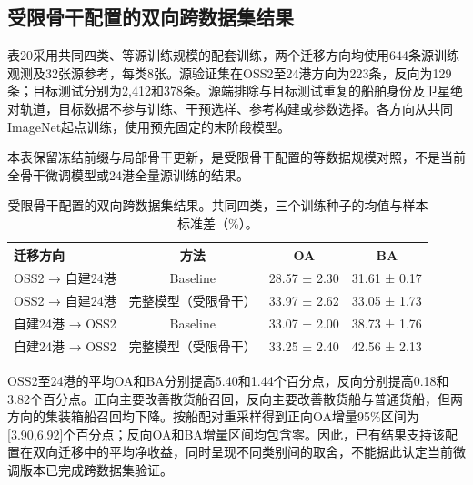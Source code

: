 \documentclass[journal,10pt,a4paper]{IEEEtran}
\begin{document}
\subsection{受限骨干配置的双向跨数据集结果}\label{ux53d7ux9650ux9aa8ux5e72ux914dux7f6eux7684ux53ccux5411ux8de8ux6570ux636eux96c6ux7ed3ux679c}

表20采用共同四类、等源训练规模的配套训练，两个迁移方向均使用644条源训练观测及32张源参考，每类8张。源验证集在OSS2至24港方向为223条，反向为129条；目标测试分别为2,412和378条。源端排除与目标测试重复的船舶身份及卫星绝对轨道，目标数据不参与训练、干预选样、参考构建或参数选择。各方向从共同ImageNet起点训练，使用预先固定的末阶段模型。

本表保留冻结前缀与局部骨干更新，是受限骨干配置的等数据规模对照，不是当前全骨干微调模型或24港全量源训练的结果。

\begin{table}[H]
\centering\footnotesize
\setcounter{table}{19}
\caption{受限骨干配置的双向跨数据集结果。共同四类，三个训练种子的均值与样本标准差（\%）。}
\label{tab:20}
\setlength{\tabcolsep}{3pt}\renewcommand{\arraystretch}{1.2}
\begin{tabularx}{\linewidth}{LCCC}
\toprule
迁移方向 & 方法 & OA & BA \\
\midrule
OSS2 → 自建24港 & Baseline & 28.57 ± 2.30 & 31.61 ± 0.17 \\
OSS2 → 自建24港 & 完整模型（受限骨干） & 33.97 ± 2.62 & 33.05 ± 1.73 \\
自建24港 → OSS2 & Baseline & 33.07 ± 2.00 & 38.73 ± 1.76 \\
自建24港 → OSS2 & 完整模型（受限骨干） & 33.25 ± 2.40 & 42.56 ± 2.13 \\
\bottomrule
\end{tabularx}
\end{table}

OSS2至24港的平均OA和BA分别提高5.40和1.44个百分点，反向分别提高0.18和3.82个百分点。正向主要改善散货船召回，反向主要改善散货船与普通货船，但两方向的集装箱船召回均下降。按船配对重采样得到正向OA增量95\%区间为{[}3.90,6.92{]}个百分点；反向OA和BA增量区间均包含零。因此，已有结果支持该配置在双向迁移中的平均净收益，同时呈现不同类别间的取舍，不能据此认定当前微调版本已完成跨数据集验证。
\end{document}
